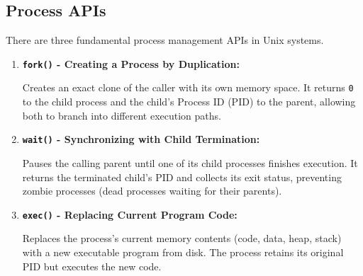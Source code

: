 \documentclass[11pt,a4paper]{article}
\begin{document}
\subsection{Process APIs}

There are three fundamental process management APIs in Unix systems.

\begin{enumerate}
    \item \textbf{\texttt{fork()} - Creating a Process by Duplication:} 
    
    Creates an exact clone of the caller with its own memory space. It returns \texttt{0} to the child process and the child's Process ID (PID) to the parent, allowing both to branch into different execution paths.
    
    \item \textbf{\texttt{wait()} - Synchronizing with Child Termination:} 
    
    Pauses the calling parent until one of its child processes finishes execution. It returns the terminated child's PID and collects its exit status, preventing zombie processes (dead processes waiting for their parents).
    
    \item \textbf{\texttt{exec()} - Replacing Current Program Code:} 
    
    Replaces the process's current memory contents (code, data, heap, stack) with a new executable program from disk. The process retains its original PID but executes the new code.
\end{enumerate}
\end{document}
